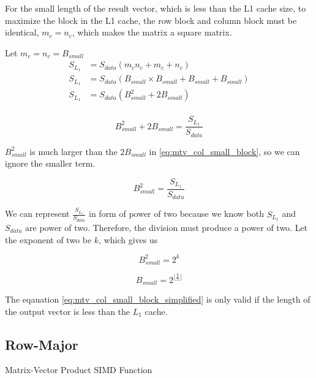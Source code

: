 For the small length of the result vector, which is less than the L1 
cache size, to maximize the block in the L1 cache, the row block and 
column block must be identical, $m_c = n_c$, which makes the matrix a square matrix.

Let $m_c = n_c = B_{small}$
\begin{align*}
    S_{L_1} &= S_{data}(m_cn_c + m_c + n_c)\\
    S_{L_1} &= S_{data}(B_{small} \times B_{small} + B_{small} + B_{small})\\
    S_{L_1} &= S_{data}(B_{small}^2 + 2B_{small})\\
\end{align*}

\begin{equation}
    B_{small}^2 + 2B_{small} = \frac{S_{L_1}}{S_{data}}
    \label{eq:mtv_col_small_block} 
\end{equation}

$B_{small}^2$ is much larger than the $2B_{small}$ in \ref{eq:mtv_col_small_block}, so we can ignore the smaller term.

\[B_{small}^2 = \frac{S_{L_1}}{S_{data}}\]

We can represent $\frac{S_{L_1}}{S_{data}}$ in form of power of two because 
we know both $S_{L_1}$ and $S_{data}$ are power of two. Therefore, the division must 
produce a power of two. Let the exponent of two be $k$, which gives us

\[B_{small}^2 = 2^k\]

\begin{equation}
    B_{small} = 2^{\lfloor \frac{k}{2} \rfloor}
    \label{eq:mtv_col_small_block_simplified} 
\end{equation}

The eqauation \ref{eq:mtv_col_small_block_simplified} is only valid if the length of the output
vector is less than the $L_1$ cache.

\clearpage
\subsection{Row-Major}

\begin{algorithm}[H]
    \SetAlgoLined

    \caption{Matrix-Vector Product SIMD Function}
\end{algorithm}

